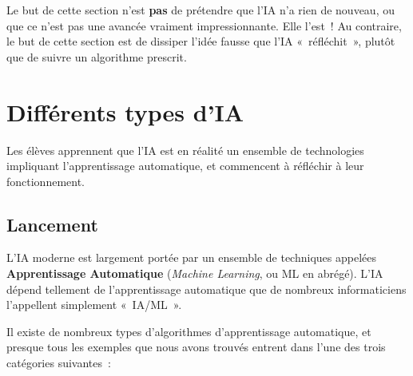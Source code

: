 \documentclass[12pt,a4paper]{article}
\newenvironment{instructornotes}{%
  \vspace{0.5em}
  \begin{tcolorbox}[colback=yellow!10!white, colframe=yellow!80!black, fonttitle=\bfseries, title=Notes pour l'enseignant·e]
}{%
  \end{tcolorbox}
  \vspace{0.5em}
}
\begin{document}
\begin{instructornotes}
  Le but de cette section n'est \textbf{pas} de prétendre que l'IA n'a rien de nouveau, ou que ce n'est pas une avancée vraiment impressionnante. Elle l'est~! Au contraire, le but de cette section est de dissiper l'idée fausse que l'IA «~réfléchit~», plutôt que de suivre un algorithme prescrit.
\end{instructornotes}

\newpage

\section{Différents types d'IA}

\begin{overviewbox}
  Les élèves apprennent que l'IA est en réalité un ensemble de technologies impliquant l'apprentissage automatique, et commencent à réfléchir à leur fonctionnement.
\end{overviewbox}

\subsection{Lancement}

L'IA moderne est largement portée par un ensemble de techniques appelées \textbf{Apprentissage Automatique} (\emph{Machine Learning}, ou ML en abrégé). L'IA dépend tellement de l'apprentissage automatique que de nombreux informaticiens l'appellent simplement «~IA/ML~».

Il existe de nombreux types d'algorithmes d'apprentissage automatique, et presque tous les exemples que nous avons trouvés entrent dans l'une des trois catégories suivantes~:
\end{document}
